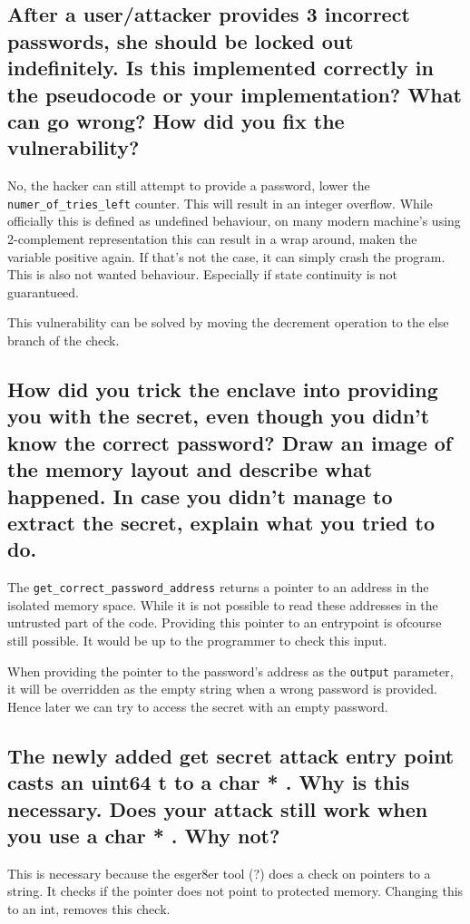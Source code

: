 \documentclass{article}
\begin{document}
\subsection{After a user/attacker provides 3 incorrect passwords, she should be locked
  out indefinitely.  Is this implemented correctly in the pseudocode or your
implementation?  What can go wrong?  How did you fix the vulnerability?}

No, the hacker can still attempt to provide a password, lower the
\texttt{numer\_of\_tries\_left} counter. This will result in an integer
overflow. While officially this is defined as undefined behaviour, on many
modern machine's using 2-complement representation this can result in a wrap
around, maken the variable positive again. If that's not the case, it can simply
crash the program. This is also not wanted behaviour. Especially if state
continuity is not guarantueed.

This vulnerability can be solved by moving the decrement operation to the else
branch of the check.

\subsection{How did you trick the enclave into providing you with the secret, even
  though you didn’t know the correct password?   Draw an image of the
  memory layout and describe what happened.  In case you didn’t manage
to extract the secret, explain what you tried to do.}

The \texttt{get\_correct\_password\_address} returns a pointer to an address in
the isolated memory space. While it is not possible to read these addresses
in the untrusted part of the code. Providing this pointer to an entrypoint is
ofcourse still possible. It would be up to the programmer to check this input. 

When providing the pointer to the password's address as the \texttt{output}
parameter, it will be overridden as the empty string when a wrong password is
provided. Hence later we can try to access the secret with an empty password.
\subsection{The newly added
  get
  secret
  attack
  entry point casts an
  uint64
  t
  to
  a
  char *
  .  Why is this necessary.  Does your attack still work when you
  use a
  char *
  .  Why not?  }

  This is necessary because the esger8er tool (?) does a check on
  pointers to a string. It checks if the pointer does not point to protected memory. Changing this to an int, removes this check.
\end{document}

